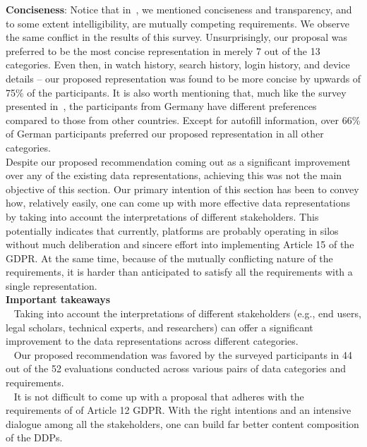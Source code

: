 \noindent
\textbf{Conciseness}:
Notice that in~, we mentioned conciseness and transparency, and to some extent intelligibility, are mutually competing requirements.
We observe the same conflict in the results of this survey.
Unsurprisingly, our proposal was preferred to be the most concise representation in merely 7 out of the 13 categories.
Even then, in watch history, search history, login history, and device details -- our proposed representation was found to be more concise by upwards of 75\% of the participants. 
It is also worth mentioning that, much like the survey presented in~, the participants from Germany have different preferences compared to those from other countries. 
Except for autofill information, over 66\% of German participants preferred our proposed representation in all other categories. \\
Despite our proposed recommendation coming out as a significant improvement over any of the existing data representations, achieving this was not the main objective of this section.
Our primary intention of this section has been to convey how, relatively easily, one can come up with more effective data representations by taking into account the interpretations of different stakeholders.
This potentially indicates that currently, platforms are probably operating in silos without much deliberation and sincere effort into implementing Article 15 of the GDPR.
At the same time, because of the mutually conflicting nature of the requirements, it is harder than anticipated to satisfy all the requirements with a single representation.
\\
\noindent
\textbf{Important takeaways}\\ %
\noindent
\faHandPointRight~ Taking into account the interpretations of different stakeholders (e.g., end users, legal scholars, technical experts, and researchers) can offer a significant improvement to the data representations across different categories.\\
\noindent
\faHandPointRight~ Our proposed recommendation was favored by the surveyed participants in 44 out of the 52 evaluations conducted across various pairs of data categories and requirements.\\
\noindent
\faHandPointRight~ It is not difficult to come up with a proposal that adheres with the requirements of  of Article 12 GDPR. With the right intentions and an intensive dialogue among all the stakeholders, one can build far better content composition of the DDPs.